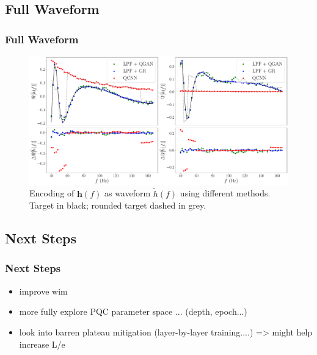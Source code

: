 \documentclass{beamer}
\begin{document}
\begin{frame}
\subsection{Full Waveform}
\frametitle{Full Waveform}
\begin{figure}[h]
\centering
\includegraphics[width=\textwidth]{im/h_comp}
\caption{Encoding of $\boldsymbol{h}(f)$ as waveform $\tilde{h}(f)$ using different methods. Target in black; rounded target dashed in grey.}
\end{figure}
\end{frame}

\begin{frame}
\section{Next Steps}
\frametitle{Next Steps}
\begin{itemize}
\item improve wim 
\item more fully explore PQC parameter space ... (depth, epoch...)
\item look into barren plateau mitigation (layer-by-layer training....) => might help increase L/e
\end{itemize}
\end{frame}
\end{document}
